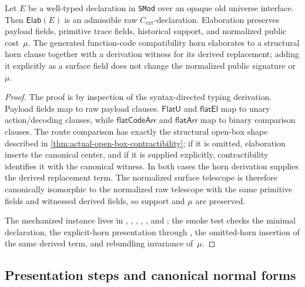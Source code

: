 \documentclass{lmcs}
\newcommand{\Cext}{C_{\mathrm{ext}}}
\begin{document}
\begin{thm}
\label{thm:modal-surface-adequacy}
Let $E$ be a well-typed declaration in \texttt{SMod} over an opaque old
universe interface. Then \(\mathsf{Elab}(E)\) is an admissible raw
\(\Cext\)-declaration. Elaboration preserves payload fields, primitive trace
fields, historical support, and normalized public cost~\(\mu\). The generated
function-code compatibility horn elaborates to a structural horn clause
together with a derivation witness for its derived replacement; adding it
explicitly as a surface field does not change the normalized public signature
or~\(\mu\).
\end{thm}

\begin{proof}
The proof is by inspection of the syntax-directed typing derivation. Payload
fields map to raw payload clauses. \(\mathsf{FlatU}\) and
\(\mathsf{flatEl}\) map to unary action/decoding clauses, while
\(\mathsf{flatCodeArr}\) and \(\mathsf{flatArr}\) map to binary comparison
clauses. The route comparison has exactly the structural open-box shape
described in \autoref{thm:actual-open-box-contractibility}; if it is omitted,
elaboration inserts the canonical center, and if it is supplied explicitly,
contractibility identifies it with the canonical witness. In both cases the
horn derivation supplies the derived replacement term. The normalized surface
telescope is therefore canonically isomorphic to the normalized raw telescope
with the same primitive fields and witnessed derived fields, so support and
\(\mu\) are preserved.

The mechanized instance lives in
,
,
,
,
, and
; the smoke test
 checks the minimal
declaration, the explicit-horn presentation through
, the
omitted-horn insertion of the same derived term, and rebundling invariance
of~\(\mu\).
\end{proof}

\subsection{Presentation steps and canonical normal forms}
\end{document}
